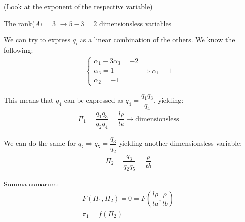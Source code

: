 \noindent (Look at the exponent of the respective variable)\par
\noindent The rank($A$) = 3 $\rightarrow 5-3 = 2$ dimensionsless variables\par
\noindent We can try to express $q_i$ as a linear combination of the others. We know the following:
\begin{equation*}
  \begin{gathered}
    \begin{cases*}
      \alpha_1-3\alpha_3 = -2\\
      \alpha_3 = 1\\
      \alpha_2 = -1
    \end{cases*}\Rightarrow \alpha_1 = 1
  \end{gathered}
\end{equation*}
\par\bigskip
\noindent This means that $q_4$ can be expressed as $q_4 = \dfrac{q_1q_3}{q_4}$, yielding:
\begin{equation*}
  \begin{gathered}
    \Pi_1 = \dfrac{q_1q_3}{q_2q_4} = \dfrac{l\rho}{ta}\rightarrow\text{dimensionsless}
  \end{gathered}
\end{equation*}
\par\bigskip
\noindent We can do the same for $q_5\Rightarrow q_5 = \dfrac{q_3}{q_2}$ yielding another dimensionsless variable:
\begin{equation*}
  \begin{gathered}
    \Pi_2 = \dfrac{q_3}{q_2q_5} = \dfrac{\rho}{tb}
  \end{gathered}
\end{equation*}
\par\bigskip
\noindent Summa sumarum:
\begin{equation*}
  \begin{gathered}
    F(\Pi_1,\Pi_2) = 0 = F\left(\dfrac{l\rho}{ta}, \dfrac{\rho}{tb}\right)\\
    \pi_1 = f(\Pi_2)
  \end{gathered}
\end{equation*}
\par\bigskip

